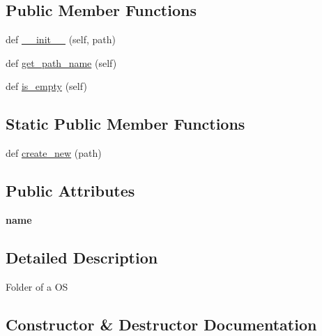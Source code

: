 \subsection*{Public Member Functions}
\begin{DoxyCompactItemize}
\item 
def \hyperlink{classhal_1_1files_1_1models_1_1_directory_ae4f13948eb8127b0c62f56d0ddf154b1}{\+\_\+\+\_\+init\+\_\+\+\_\+} (self, path)
\item 
def \hyperlink{classhal_1_1files_1_1models_1_1_directory_a58118af8552193237b38f7f341773707}{get\+\_\+path\+\_\+name} (self)
\item 
def \hyperlink{classhal_1_1files_1_1models_1_1_directory_a2a7a4af7d8d8d9e8e0d121ae9b673ce7}{is\+\_\+empty} (self)
\end{DoxyCompactItemize}
\subsection*{Static Public Member Functions}
\begin{DoxyCompactItemize}
\item 
def \hyperlink{classhal_1_1files_1_1models_1_1_directory_ac1f283483a8ae3cdc09634882be2e419}{create\+\_\+new} (path)
\end{DoxyCompactItemize}
\subsection*{Public Attributes}
\begin{DoxyCompactItemize}
\item 
{\bfseries name}\hypertarget{classhal_1_1files_1_1models_1_1_directory_a881eb92f96a89ccd626fb1c4be7da135}{}\label{classhal_1_1files_1_1models_1_1_directory_a881eb92f96a89ccd626fb1c4be7da135}

\end{DoxyCompactItemize}


\subsection{Detailed Description}
\begin{DoxyVerb}Folder of a OS \end{DoxyVerb}
 

\subsection{Constructor \& Destructor Documentation}
